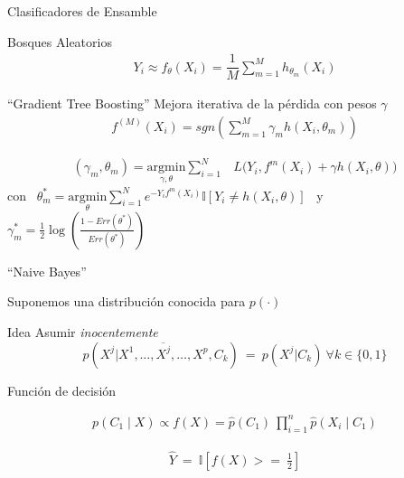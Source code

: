 \documentclass[xcolor=x11names]{beamer}
\begin{document}
\begin{frame}[shrink=2]{Clasificadores de Ensamble }


	\begin{block}{Bosques Aleatorios}
		\begin{align*}
			Y_i \approx f_{\theta}(X_i) = \dfrac{1}{M}\sum_{m=1}^M h_{\theta_m}(X_i)
		\end{align*}

	\end{block}

	\begin{block}{``Gradient Tree Boosting''}
		Mejora iterativa de la pérdida con pesos $\gamma$
		\begin{align*}
			f^{(M)}(X_i) = sgn \left(\sum_{m=1}^{M} \gamma_m h(X_i,\theta_m) \right)
		\end{align*}

		\begin{align*}
				(\gamma_{m}, \theta_{m}) = \underset{\gamma, \theta}{\mathrm{argmin}} \sum_{i=1}^{N} & L\big( Y_i,  f^{m}(X_i) + \gamma h(X_i,\theta) \big)
		\end{align*}
		con \  $\theta^*_{m} = \underset{ \theta}{\mathrm{argmin}} \sum_{i=1}^{N}e^{-Y_i f^{m}(X_i)}
		\mathbb{I}\left[ Y_i \neq h(X_i,\theta)  \right]$ \ y \
		$\gamma^*_{m} = \frac{1}{2} \log\left( \frac{1 - Err(\theta^*) }{ Err(\theta^*) } \right)$

	\end{block}


\end{frame}




\begin{frame}{``Naive Bayes''}

Suponemos una distribución conocida para $p(\cdot)$
	\begin{block}{Idea}
		Asumir \textit{inocentemente}
		$$p(X^j |X^1,\ldots,\overline{X^j},\ldots,X^p, C_k) \ = \ p(X^j | C_k) \ \forall k \in \{0,1\}$$
	\end{block}

	\begin{block}{Función de decisión }

		\begin{align*}
			p(C_1 \mid X) \propto f(X) = \hat{p}(C_{1}) \  \prod_{i=1}^{n} \hat{p}(X_{i}\mid C_{1})
		\end{align*}

		\begin{align*}
			\hat{Y} \ = \ \mathbb{I}\left[  f(X)  >= \ \frac{1}{2} \right]
		\end{align*}

	\end{block}
\end{frame}
\end{document}
